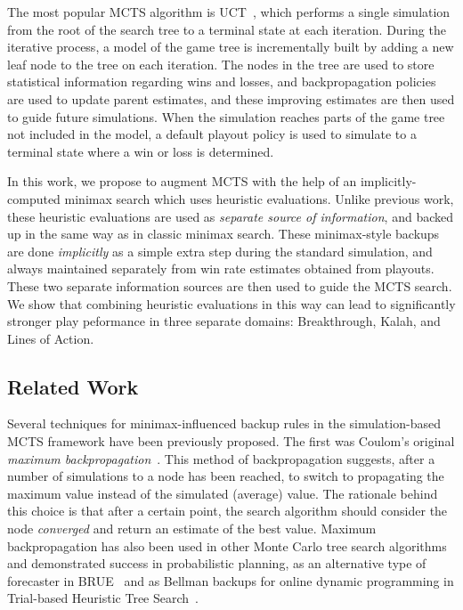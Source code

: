 \documentclass[letterpaper]{article}
\begin{document}
The most popular MCTS algorithm is UCT~\cite{Kocsis06Bandit}, 
which performs a single simulation from the root of the search tree to a terminal state at each iteration. 
During the iterative process, a model of the game tree is incrementally built by adding a 
new leaf node to the tree on each iteration. 
The nodes in the tree are used to store statistical information regarding wins and losses, and backpropagation
policies are used to update parent estimates, and these improving estimates are then used to guide future simulations. 
When the simulation reaches parts of the game tree not included in the model, a default playout policy
is used to simulate to a terminal state where a win or loss is determined. 

In this work, we propose to augment MCTS with the help of 
an implicitly-computed minimax search which uses heuristic evaluations. 
Unlike previous work, these heuristic evaluations are used as {\it separate source of information}, 
and backed up in the same way as in classic minimax search. These minimax-style backups are done {\it implicitly}
as a simple extra step during the standard simulation, and always maintained separately from win rate estimates obtained
from playouts. These two separate information sources are then used to guide the MCTS search. 
We show that combining heuristic evaluations in this way can lead to significantly stronger play peformance in three 
separate domains: Breakthrough, Kalah, and Lines of Action. 

\subsection{Related Work}

Several techniques for minimax-influenced backup rules in the simulation-based MCTS framework have been previously proposed. 
The first was Coulom's original {\it maximum backpropagation}~\cite{Coulom06Efficient}. This method of backpropagation
suggests, after a number of simulations to a node has been reached, to switch to propagating the maximum value instead 
of the simulated (average) value. 
The rationale behind this choice is that after a certain point, the search algorithm should consider the node
{\it converged} and return an estimate of the best value. 
Maximum backpropagation has also been used in other Monte Carlo tree search algorithms and demonstrated success in
probabilistic planning, as an alternative type of forecaster in BRUE~\cite{Feldman13Theoretically} and as Bellman 
backups for online dynamic programming in Trial-based Heuristic Tree Search~\cite{Keller13Trial}.
\end{document}

